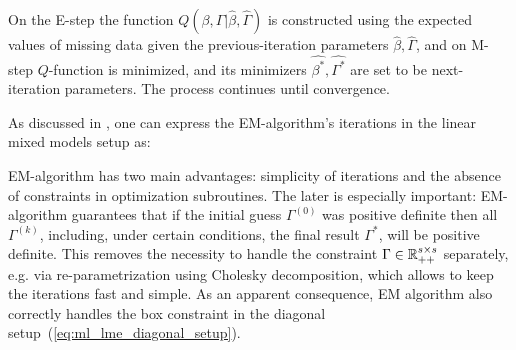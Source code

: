 \documentclass[11pt,letterpaper]{article}
\numberwithin{equation}{section} %
\numberwithin{figure}{section} %
\numberwithin{table}{section} %
\begin{document}


On the E-step the function $Q(\beta, \Gamma | \hat{\beta}, \hat{\Gamma})$ is constructed using the expected values of missing data given the previous-iteration parameters $\hat{\beta}, \hat{\Gamma}$, and on M-step $Q$-function is minimized, and its minimizers $\hat{\beta^*}, \hat{\Gamma^*}$ are set to be next-iteration parameters. The process continues until convergence.
 


As discussed in \cite{Laird1987}, one can express the EM-algorithm's iterations in the linear mixed models setup as:


EM-algorithm has two main advantages: simplicity of iterations and the absence of constraints in optimization subroutines. The later is especially important: EM-algorithm guarantees that if the initial guess $\Gamma^{(0)}$ was positive definite then all $\Gamma^{(k)}$, including, under certain conditions, the final result $\Gamma^*$, will be positive definite. This removes the necessity to handle the constraint $\Gamma \in \operatorname{\mathbb{R}}^{s\times s}_{++}$ separately, e.g. via re-parametrization using Cholesky decomposition, which allows to keep the iterations fast and simple. As an apparent consequence, EM algorithm also correctly handles the box constraint in the diagonal setup~(\ref{eq:ml_lme_diagonal_setup}).
\end{document}
